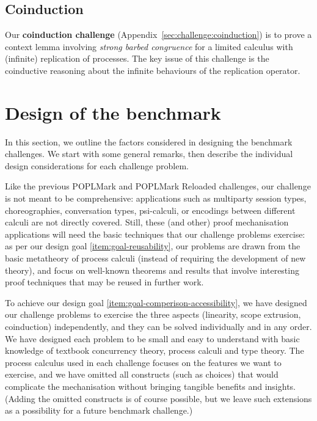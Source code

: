 \documentclass[runningheads]{llncs}
\begin{document}
\subsection{Coinduction}
Our \textbf{coinduction challenge} (Appendix~\ref{sec:challenge:coinduction}) is to prove a context lemma involving \emph{strong barbed congruence} for a limited calculus with (infinite) replication of processes.
The key issue of this challenge is the coinductive reasoning about the infinite behaviours of the replication operator.

\section{Design of the benchmark}\label{sec:design-discussion}

In this section, we outline the factors considered in designing the
benchmark challenges. We start with some general remarks, then
describe the individual design considerations for each challenge
problem.

Like the previous POPLMark and POPLMark Reloaded challenges, our challenge is not meant to be comprehensive: applications such as multiparty session types, choreographies, conversation types, psi-calculi, or encodings between different calculi are not directly covered.  Still, these (and other) proof mechanisation applications will need the basic techniques that our challenge problems exercise:
as per our design goal \ref{item:goal-reusability},
our problems are drawn from the basic metatheory of process calculi (instead
of requiring the development of new theory), and focus on well-known theorems
and results that involve interesting proof techniques that may be reused in further work.

To achieve our design goal \ref{item:goal-comperison-accessibility},
we have designed our challenge problems to exercise the three aspects (linearity, scope extrusion, coinduction) independently, and they can be solved individually and in any order.
We have designed each problem to be small and easy to understand with basic knowledge of textbook concurrency theory, process calculi and type theory.  The process calculus used in each challenge
focuses on the features we want to exercise, and we have omitted all constructs
(such as choices) that would complicate the mechanisation without bringing tangible
benefits and insights.  (Adding the omitted constructs is of course possible, but we leave
such extensions as a possibility for a future benchmark challenge.)
\end{document}
